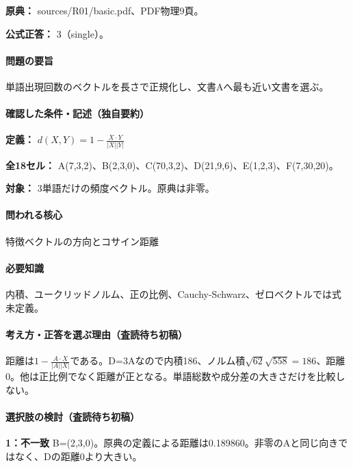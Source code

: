 \noindent\textbf{原典：} sources/R01/basic.pdf、PDF物理9頁。

\textbf{公式正答：} 3（single）。

\paragraph{問題の要旨} 単語出現回数のベクトルを長さで正規化し、文書Aへ最も近い文書を選ぶ。

\paragraph{確認した条件・記述（独自要約）}\mbox{}\par

\noindent\textbf{定義：} \(d(X,Y)=1-\frac{X\cdot Y}{|X||Y|}\)\par

\noindent\textbf{全18セル：} A(7,3,2)、B(2,3,0)、C(70,3,2)、D(21,9,6)、E(1,2,3)、F(7,30,20)。\par

\noindent\textbf{対象：} 3単語だけの頻度ベクトル。原典は非零。\par

\paragraph{問われる核心} 特徴ベクトルの方向とコサイン距離

\paragraph{必要知識} 内積、ユークリッドノルム、正の比例、Cauchy-Schwarz、ゼロベクトルでは式未定義。

\paragraph{考え方・正答を選ぶ理由（査読待ち初稿）} 距離は\(1-\frac{A\cdot X}{|A||X|}\)である。D=\allowbreak{}3Aなので内積186、ノルム積\(\sqrt{62}\sqrt{558}=186\)、距離0。他は正比例でなく距離が正となる。単語総数や成分差の大きさだけを比較しない。

\paragraph{選択肢の検討（査読待ち初稿）}\mbox{}\par

\noindent\textbf{1：不一致} B=\allowbreak{}(2,3,0)。原典の定義による距離は0.189860。非零のAと同じ向きではなく、Dの距離0より大きい。\par

